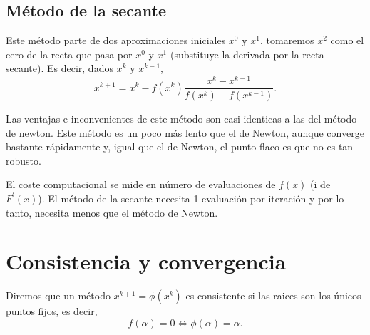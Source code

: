 \begin{center}
\end{center}

\subsection{Método de la secante}

Este método parte de dos aproximaciones iniciales $x^0$ y $x^1$, tomaremos $x^2$ como el cero de la recta
que pasa por $x^0$ y $x^1$ (substituye la derivada por la recta secante). Es decir, dados $x^k$ y $x^{k-1}$,
\[
    x^{k+1} = x^k - f\left( x^k \right) \frac{x^k - x^{k-1}}{f\left( x^k \right) - f\left( x^{k-1} \right)}.
\]

Las ventajas e inconvenientes de este método son casi identicas a las del método de newton. Este método
es un poco más lento que el de Newton, aunque converge bastante rápidamente y, igual que el de Newton,
el punto flaco es que no es tan robusto.

\begin{obs*}
    El coste computacional se mide en número de evaluaciones de $f(x)$ (i de $F^\prime(x)$).
    El método de la secante necesita 1 evaluación por iteración y por lo tanto, necesita menos que
    el método de Newton.
\end{obs*}

\section{Consistencia y convergencia}

\begin{defi}
    Diremos que un método $x^{k+1} = \phi\left( x^k \right)$ es consistente si las raices son
    los únicos puntos fijos, es decir,
    \[
        f(\alpha) = 0 \iff \phi(\alpha) = \alpha.
    \]
\end{defi}

